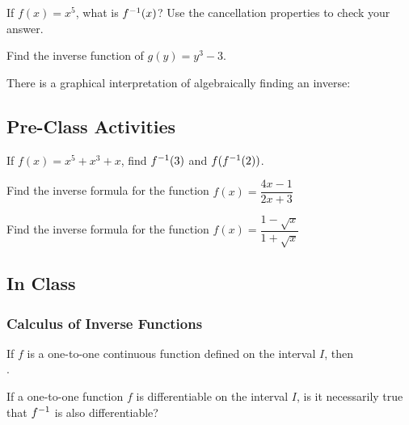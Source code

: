 \documentclass[notes]{subfiles}
\begin{document}
		\begin{ex}
			If $f(x) = x^5$, what is $f^{-1}(x)$?  Use the cancellation properties to check your answer.
		\end{ex}
			
		\begin{ex}
			Find the inverse function of $g(y) = y^3 - 3$.
		\end{ex}
			
		There is a graphical interpretation of algebraically finding an inverse:
			\newpage
			
	\subsection*{Pre-Class Activities}
		\begin{ex}
			If $f(x) = x^5 + x^3 + x$, find $f^{-1}(3)$ and $f(f^{-1}(2))$.
		\end{ex}
			
		\begin{ex}
			Find the inverse formula for the function $f(x) = \dfrac{4x-1}{2x+3}$
		\end{ex}
			
		\begin{ex}
			Find the inverse formula for the function $f(x) = \dfrac{1-\sqrt{x}}{1+\sqrt{x}}$
		\end{ex}
		\newpage
		
	\subsection*{In Class}
	\subsubsection*{Calculus of Inverse Functions}
		\begin{rmk}
			If $f$ is a one-to-one continuous function defined on the interval $I$, then \\[15pt] .
		\end{rmk}
		
		\begin{question}
			If a one-to-one function $f$ is differentiable on the interval $I$, is it necessarily true that $f^{-1}$ is also differentiable?  
		\end{question}
			
\end{document}
